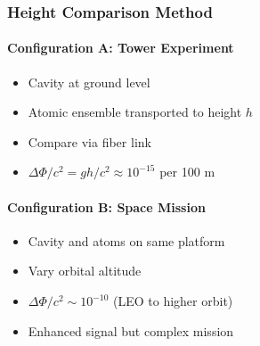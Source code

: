 \begin{table}[h!]
\centering
\caption{Cavity-atom test specifications.}
\label{tab:cavity_atom_specs}
\end{table}

\subsubsection{Height Comparison Method}

\paragraph{Configuration A: Tower Experiment}
\begin{itemize}
\item Cavity at ground level
\item Atomic ensemble transported to height $h$
\item Compare via fiber link
\item $\Delta\Phi/c^2 = gh/c^2 \approx 10^{-15}$ per 100 m
\end{itemize}

\paragraph{Configuration B: Space Mission}
\begin{itemize}
\item Cavity and atoms on same platform
\item Vary orbital altitude
\item $\Delta\Phi/c^2 \sim 10^{-10}$ (LEO to higher orbit)
\item Enhanced signal but complex mission
\end{itemize}


